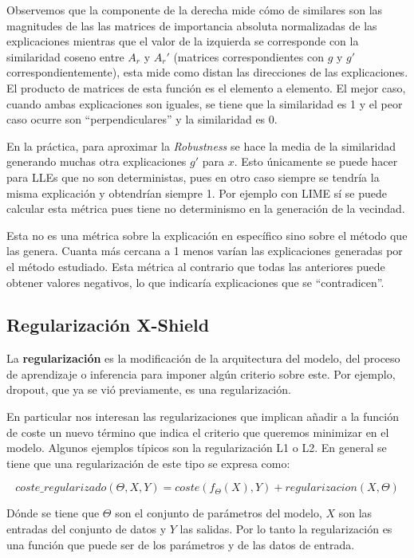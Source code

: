 Observemos que la componente de la derecha mide cómo de similares son las magnitudes de las las matrices de importancia absoluta normalizadas de las explicaciones mientras que el valor de la izquierda se corresponde con la similaridad coseno entre $A_r$ y $A_r'$ (matrices correspondientes con $g$ y $g'$ correspondientemente), esta mide como distan las direcciones de las explicaciones. El producto de matrices de esta función es el elemento a elemento. El mejor caso, cuando ambas explicaciones son iguales, se tiene que la similaridad es 1 y el peor caso ocurre son ``perpendiculares'' y la similaridad es 0. 

En la práctica, para aproximar la \textit{Robustness} se hace la media de la similaridad generando muchas otra explicaciones $g'$ para $x$. Esto únicamente se puede hacer para LLEs que no son deterministas, pues en otro caso siempre se tendría la misma explicación y obtendrían siempre 1. Por ejemplo con LIME sí se puede calcular esta métrica pues tiene no determinismo en la generación de la vecindad.


Esta no es una métrica sobre la explicación en específico sino sobre el método que las genera. Cuanta más cercana a 1 menos varían las explicaciones generadas por el método estudiado. Esta métrica al contrario que todas las anteriores puede obtener valores negativos, lo que indicaría explicaciones que se ``contradicen''.

\subsection{Regularización X-Shield}

La \textbf{regularización} \cite{XSHIELD, Regularization} es la modificación de la arquitectura del modelo, del proceso de aprendizaje o inferencia para imponer algún criterio sobre este. Por ejemplo, dropout, que ya se vió previamente, es una regularización. 

En particular nos interesan las regularizaciones que implican añadir a la función de coste un nuevo término que indica el criterio que queremos minimizar en el modelo. Algunos ejemplos típicos son la regularización L1 o L2. En general se tiene que una regularización de este tipo se expresa como:

\begin{equation}
coste\_regularizado(\Theta, X, Y) = coste(f_\Theta (X), Y) + regularizacion(X,\Theta )
\end{equation}

Dónde se tiene que $\Theta$ son el conjunto de parámetros del modelo, $X$ son las entradas del conjunto de datos y $Y$ las salidas. Por lo tanto la regularización es una función que puede ser de los parámetros y de las datos de entrada.

